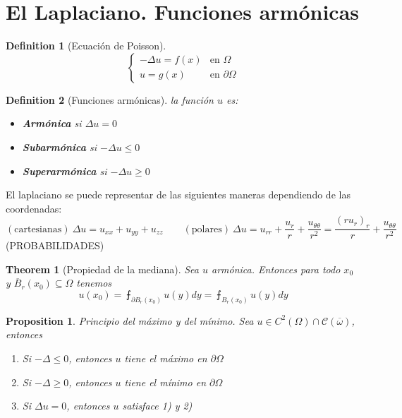 \documentclass[leqno]{article}
\newtheorem*{theorem}{Theorem}
\newtheorem*{proposition}{Proposition}
\newtheorem*{definition}{Definition}
\begin{document}
\section{El Laplaciano. Funciones armónicas}
\begin{definition}[Ecuación de Poisson]
\[
\begin{cases}
  -\Delta u = f(x) & \text{en } \Omega  \\
  u=g(x)   & \text{en } \partial  \Omega 
\end{cases}
\] 
\end{definition}

\begin{definition}[Funciones armónicas] la función $u$ es:
  \begin{itemize}[topsep=-6pt, itemsep=0pt]
	\item \textbf{Armónica} si $\Delta u = 0$
	\item \textbf{Subarmónica} si $-\Delta u \le  0$
	\item \textbf{Superarmónica} si $-\Delta u \ge  0$
  \end{itemize}
\end{definition}

El laplaciano se puede representar de las siguientes maneras dependiendo de las coordenadas:
\[
  (\text{cartesianas})\ \Delta u = u_{x x} + u_{yy} + u_{zz} \qquad (\text{polares}) \ \Delta u = u_{rr} + \frac{u_r}{r} + \frac{u_{\theta  \theta }}{r^2} = \frac{(ru_r)_r}{r} + \frac{u_{\theta \theta }}{r^2}
\] 
(PROBABILIDADES)

\begin{theorem}[Propiedad de la mediana] Sea $u$ armónica. Entonces para todo  $x_0$ y  $\overline{B}_r(x_0) \subseteq \Omega $ tenemos
\[
u(x_0) = \intbar_{\partial B_r(x_0)} u(y)dy = \intbar_{B_r(x_0)}u(y)dy
\] 
\end{theorem}

\begin{proposition}Principio del máximo y del mínimo. Sea $u\in \mathcal{}{C}^2(\Omega )\cap \mathcal{C}(\overline{\omega })$, entonces 
  \begin{enumerate}[topsep=-6pt, itemsep=0pt]
	\item Si $-\Delta \le 0$, entonces $u$ tiene el máximo en  $\partial \Omega $ 
	\item Si $-\Delta \ge  0$, entonces $u$ tiene el mínimo en  $\partial \Omega $ 
	\item Si $\Delta u = 0$, entonces $u$ satisface 1) y 2)
  \end{enumerate}
\end{proposition}
\end{document}
